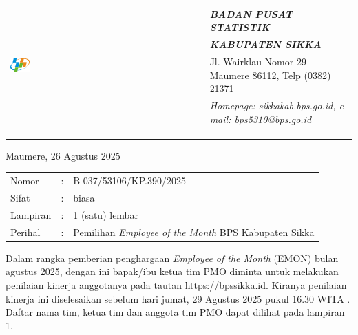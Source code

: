 \documentclass{article}
\begin{document}




\begin{tabular}{ll}
   \multirow{4}{*}{\includegraphics[width=0.10\textwidth]{logo/bps-logo.png}} %
   &
   \large{\textbf{\textit{BADAN PUSAT STATISTIK}}} \\
   & \large{\textbf{\textit{KABUPATEN SIKKA}}} \\
   & Jl. Wairklau Nomor 29 Maumere 86112, Telp (0382) 21371 \\
   & \textit{Homepage: sikkakab.bps.go.id, e-mail: bps5310@bps.go.id} \\
\end{tabular}

\hfill

\vspace{-1em} %

\rule{\linewidth}{1pt} %


\hfill
Maumere, 26 Agustus 2025

\begin{tabular}{@{} lcl}
	Nomor&:&B-037/53106/KP.390/2025 \\
	Sifat&:&biasa \\
	Lampiran&:&1 (satu) lembar\\
    Perihal&:& Pemilihan \textit{Employee of the Month} BPS Kabupaten Sikka\\
\end{tabular}

\bigskip %

Dalam rangka pemberian penghargaan \textit{Employee of the Month} (EMON) bulan agustus 2025, dengan ini bapak/ibu ketua tim PMO diminta untuk melakukan penilaian kinerja anggotanya pada tautan \href{https://bpssikka.id/}{https://bpssikka.id}.
Kiranya penilaian kinerja ini diselesaikan sebelum hari jumat, 29 Agustus 2025 pukul 16.30 WITA \@.
Daftar nama tim, ketua tim dan anggota tim PMO dapat dilihat pada lampiran 1.
\end{document}
